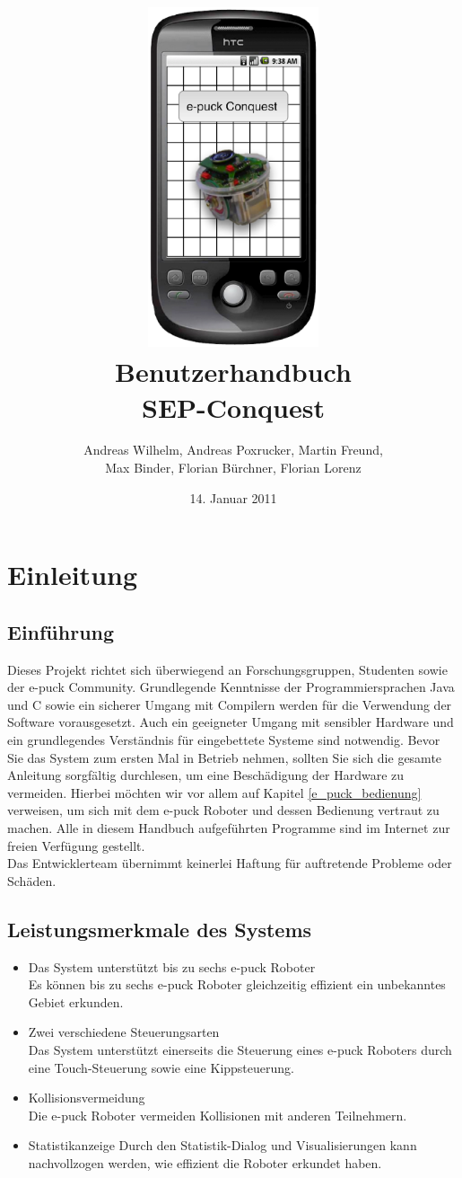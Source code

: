 \documentclass[10pt,a4paper]{article}
\title{
	\includegraphics[height=10cm]{images/logo.eps} \\
	\vspace{1cm}
	Benutzerhandbuch \\
	SEP-Conquest
}
\author{Andreas Wilhelm, Andreas Poxrucker, Martin Freund,\\ Max Binder, Florian B\"urchner, Florian Lorenz}
\let\oldsection\section
\renewcommand{\section}{\newpage \oldsection}
\begin{document}
\date{14. Januar 2011}
	\maketitle
	\newpage
	\tableofcontents	
	\newpage
\section{Einleitung}
	\subsection{Einf\"uhrung}
		Dieses Projekt richtet sich \"uberwiegend an Forschungsgruppen, Studenten sowie der e-puck Community. Grundlegende Kenntnisse der Programmiersprachen 
		Java und C sowie ein sicherer Umgang mit Compilern werden f\"ur die Verwendung der Software vorausgesetzt. Auch ein geeigneter Umgang mit sensibler 
		Hardware und ein grundlegendes Verst\"andnis f\"ur eingebettete Systeme sind notwendig. Bevor Sie das System zum ersten Mal in Betrieb 
		nehmen, sollten Sie sich  die gesamte Anleitung sorgf\"altig durchlesen, um eine Besch\"adigung der Hardware zu vermeiden. Hierbei m\"ochten wir vor allem auf
		Kapitel \ref{e_puck_bedienung} verweisen, um sich mit dem e-puck Roboter und dessen Bedienung vertraut zu machen. Alle in diesem Handbuch  
		aufgef\"uhrten Programme	sind im Internet zur freien Verf\"ugung gestellt.\\ 
		Das Entwicklerteam \"ubernimmt keinerlei Haftung f\"ur auftretende Probleme oder Sch\"aden. \\ 
	\subsection{Leistungsmerkmale des Systems}
		\begin{itemize}
			\item{Das System unterstützt bis zu sechs e-puck Roboter} \\		
				Es k\"onnen bis zu sechs e-puck Roboter gleichzeitig effizient ein unbekanntes Gebiet erkunden.
			\item{Zwei verschiedene Steuerungsarten} \\
				Das System unterst\"utzt einerseits die Steuerung eines e-puck Roboters durch eine Touch-Steuerung sowie eine Kippsteuerung.
			\item{Kollisionsvermeidung} \\
				Die e-puck Roboter vermeiden Kollisionen mit anderen Teilnehmern.
			\item{Statistikanzeige}
				Durch den Statistik-Dialog und Visualisierungen kann nachvollzogen werden, wie effizient die Roboter erkundet haben.
		\end{itemize}		
\end{document}
